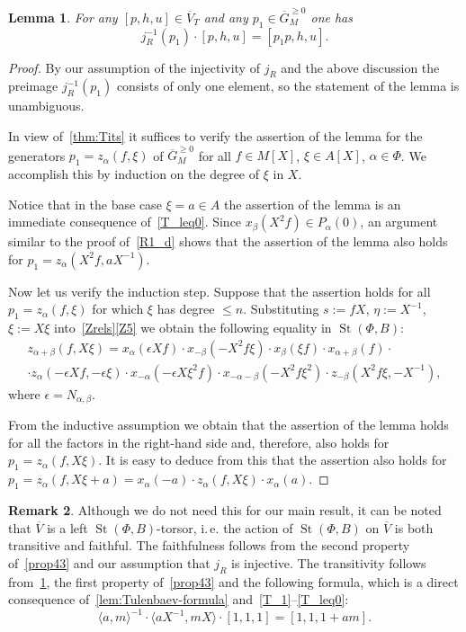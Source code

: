 \documentclass[10pt,a4paper,twoside]{article}
\newtheorem{lemma}{Lemma}
\theoremstyle{remark}
\theoremstyle{definition}
\numberwithin{lemma}{section}
\numberwithin{prop}{section}
\numberwithin{corollary}{section}
\numberwithin{externaltheorem}{section}
\newtheorem{rem}[lemma]{Remark}
\DeclareMathOperator{\St}{St}
\numberwithin{equation}{section}
\begin{document}
\begin{lemma}\label{lem:action} For any $[p, h, u]\in \overline{V}_T$ and any $p_1 \in \overline{G}^{\geq 0}_M$ one has 
\[j_R^{-1}(p_1) \cdot [p, h, u] = [p_1p, h, u].\] \end{lemma}
\begin{proof} 
By our assumption of the injectivity of $j_R$ and the above discussion the preimage $j_R^{-1}(p_1)$ consists of only one element, so the statement of the lemma is unambiguous.

In view of~\cref{thm:Tits} it suffices to verify the assertion of the lemma for the generators $p_1 = z_\alpha(f, \xi)$ of $\overline{G}_M^{\geq 0}$ for all $f \in M[X]$, $\xi\in A[X]$, $\alpha \in \Phi$. We accomplish this by induction on the degree of $\xi$ in $X$. 

Notice that in the base case $\xi = a \in A$ the assertion of the lemma is an immediate consequence of~\eqref{T_leq0}.
Since $x_\beta(X^2f) \in P_\alpha(0)$, an argument similar to the proof of~\cref{R1_d} shows that the assertion of the lemma also holds for $p_1 = z_\alpha(X^2f, aX^{-1})$.

Now let us verify the induction step.
Suppose that the assertion holds for all $p_1 = z_\alpha(f, \xi)$ for which $\xi$ has degree $\leq n$.
Substituting $s := fX$, $\eta := X^{-1}$, $\xi := X\xi$ into~\cref{Zrels}\ref{Z5} we obtain the following equality in $\St(\Phi, B)$:
\begin{multline*}
 z_{\alpha+\beta}(f, X\xi) = x_\alpha(\epsilon Xf) \cdot x_{-\beta}(-X^2 f\xi ) \cdot x_{\beta}(\xi f) \cdot x_{\alpha+\beta}(f) \cdot \\ \cdot z_\alpha(-\epsilon Xf, -\epsilon \xi) \cdot x_{-\alpha}(-\epsilon X\xi^2f) \cdot x_{-\alpha-\beta}(- X^2f \xi^2) \cdot z_{-\beta}(X^2f\xi, -X^{-1}), \end{multline*}
where $\epsilon = N_{\alpha, \beta}$.

From the inductive assumption we obtain that the assertion of the lemma holds for all the factors in the right-hand side and, therefore, also holds for $p_1 = z_\alpha(f, X\xi)$. It is easy to deduce from this that the assertion also holds for $p_1 = z_\alpha(f, X\xi + a) = x_\alpha(-a) \cdot z_\alpha(f, X\xi) \cdot x_\alpha(a)$. 
\end{proof}

\begin{rem} Although we do not need this for our main result, it can be noted that $\overline{V}$ is a left $\St(\Phi, B)$-torsor, i.\,e. the action of $\St(\Phi, B)$ on $\overline{V}$ is both transitive and faithful. The faithfulness follows from the second property of~\cref{prop43} and our assumption that $j_R$ is injective. The transitivity follows from~\cref{lem:action}, the first property of~\cref{prop43} and the following formula, which is a direct consequence of~\cref{lem:Tulenbaev-formula} and~\eqref{T_1}--\eqref{T_leq0}:
\begin{equation*} \langle a, m \rangle^{-1} \cdot \langle aX^{-1}, mX \rangle \cdot [1, 1, 1] = [1, 1, 1+am]. \end{equation*} \end{rem}
\end{document}
